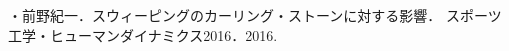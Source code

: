 \documentclass[main]{subfiles}
\begin{document}
{}

・前野紀一．スウィーピングのカーリング・ストーンに対する影響．
スポーツ工学・ヒューマンダイナミクス2016．2016.
\printbibliography[title=参考文献]
\end{document}
